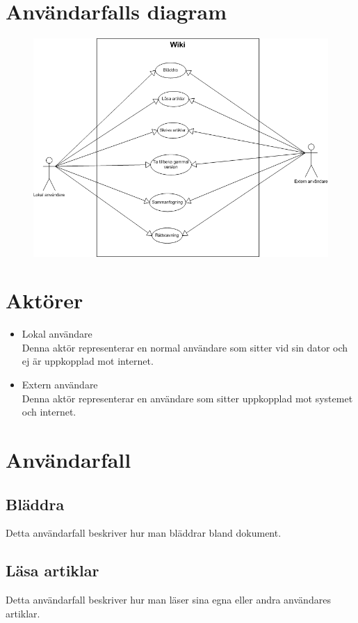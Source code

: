 \section{Användarfalls diagram}
 \begin{figure}[H] %
  \centering
  \includegraphics[scale=0.50]{Use-case-diagram.png}
\end{figure}
\section{Aktörer}
\begin{itemize}
	\item Lokal användare
	\\Denna aktör representerar en normal användare som sitter vid sin dator och ej är uppkopplad mot internet.
	\item Extern användare
	\\Denna aktör representerar en användare som sitter uppkopplad mot systemet och internet.
\end{itemize}
\section{Användarfall}
\subsection{Bläddra}
Detta användarfall beskriver hur man bläddrar bland dokument.
\subsection{Läsa artiklar}
Detta användarfall beskriver hur man läser sina egna eller andra användares artiklar.
